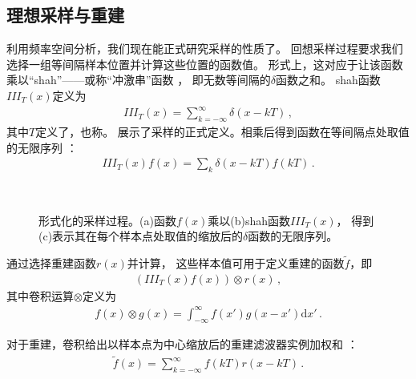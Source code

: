 \subsection{理想采样与重建}\label{sub:理想采样与重建}
利用频率空间分析，我们现在能正式研究采样的性质了。
回想采样过程要求我们选择一组等间隔样本位置并计算这些位置的函数值。
形式上，这对应于让该函数乘以“shah”——或称“冲激串”函数
，
即无数等间隔的$\delta$函数之和。
shah函数$III_T(x)$定义为
\begin{align*}
    III_T(x)=\sum\limits_{k=-\infty}^{\infty}\delta(x-kT)\, ,
\end{align*}
其中$T$定义了，也称。
展示了采样的正式定义。相乘后得到函数在等间隔点处取值的无限序列
：
\begin{align*}
    III_T(x)f(x)=\sum\limits_k\delta(x-kT)f(kT)\, .
\end{align*}
\begin{figure}[htbp]
    \centering
    \,
    \,
    \caption{形式化的采样过程。(a)函数$f(x)$乘以(b)shah函数$III_T(x)$，
        得到(c)表示其在每个样本点处取值的缩放后的$\delta$函数的无限序列。}
    \label{fig:7.4}
\end{figure}

通过选择重建函数$r(x)$并计算，
这些样本值可用于定义重建的函数$\tilde{f}$，即
\begin{align*}
    (III_T(x)f(x))\otimes r(x)\, ,
\end{align*}
其中卷积运算$\otimes$定义为
\begin{align*}
    f(x)\otimes g(x)=\int_{-\infty}^{\infty}f(x')g(x-x')\mathrm{d}x'\, .
\end{align*}

对于重建，卷积给出以样本点为中心缩放后的重建滤波器实例加权和
：
\begin{align*}
    \tilde{f}(x)=\sum\limits_{k=-\infty}^{\infty}f(kT)r(x-kT)\, .
\end{align*}

